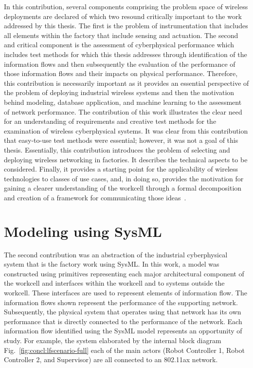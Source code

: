 In this contribution, several components comprising the problem space of wireless deployments are declared of which two resound critically important to the work addressed by this thesis.  The first is the problem of instrumentation that includes all elements within the factory that include sensing and actuation.  The second and critical component is the assessment of cyberphysical performance which includes test methods for which this thesis addresses through identification of the information flows and then subsequently the evaluation of the performance of those information flows and their impacts on physical performance.  Therefore, this contribution is necessarily important as it provides an essential perspective of the problem of deploying industrial wireless systems and then the motivation behind modeling, database application, and machine learning to the assessment of network performance.  The contribution of this work illustrates the clear need for an understanding of requirements and creative test methods for the examination of wireless cyberphysical systems.  It was clear from this contribution that easy-to-use test methods were essential; however, it was not a goal of this thesis.  Essentially, this contribution introduces the problem of selecting and deploying wireless networking in factories.  It describes the technical aspects to be considered.  Finally, it provides a starting point for the applicability of wireless technologies to classes of use cases, and, in doing so, provides the motivation for gaining a clearer understanding of the workcell through a formal decomposition and creation of a framework for communicating those ideas~\cite{CandellISIT2020.Conf}.

\section{Modeling using SysML}
The second contribution was an abstraction of the industrial cyberphysical system that is the factory work using SysML.  In this work, a model was constructed using primitives representing each major architectural component of the workcell and interfaces within the workcell and to systems outside the workcell.  These interfaces are used to represent elements of information flow.  The information flows shown represent the performance of the supporting network.  Subsequently, the physical system that operates using that network has its own performance that is directly connected to the performance of the network.  Each information flow identified using the SysML model represents an opportunity of study.  For example, the system elaborated by the internal block diagram Fig.~\ref{fig:concl:lfscenario-full} each of the main actors (Robot Controller 1, Robot Controller 2, and Supervisor) are all connected to an 802.11ax network.


